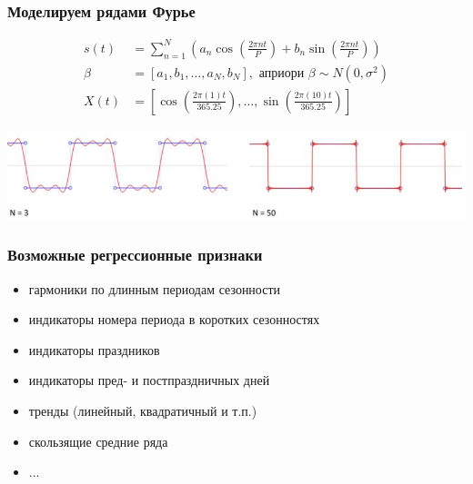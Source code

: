 \documentclass[fullscreen=true, bookmarks=true, hyperref={pdfencoding=unicode}]{beamer}
\begin{document}
\begin{frame}
  \frametitle{Моделируем рядами Фурье}

  \begin{align*}
    s(t) &= \sum\limits_{n=1}^N \left(a_n \cos\left(\frac{2\pi nt}{P}\right) + b_n \sin\left(\frac{2\pi nt}{P} \right) \right) \\
    \beta &= [a_1, b_1, \dots, a_N, b_N], \text{ априори } \beta \sim N(0, \sigma^2)\\
    X(t) &= \left[ \cos\left(\frac{2\pi(1)t}{365.25}\right), \dots, \sin\left(\frac{2\pi(10)t}{365.25}\right) \right]
  \end{align*}

  \vspace{1cm}
  \begin{center}
    \includegraphics[keepaspectratio,
                   width=.8\paperwidth]{fourie.jpg}
  \end{center}

\end{frame}


\begin{frame}
  \frametitle{Возможные регрессионные признаки}

  \begin{itemize}
    \item гармоники по длинным периодам сезонности
    \item индикаторы номера периода в коротких сезонностях
    \item индикаторы праздников
    \item индикаторы пред- и постпраздничных дней
    \item тренды (линейный, квадратичный и т.п.)
    \item скользящие средние ряда
    \item ...
  \end{itemize}

\end{frame}
\end{document}
